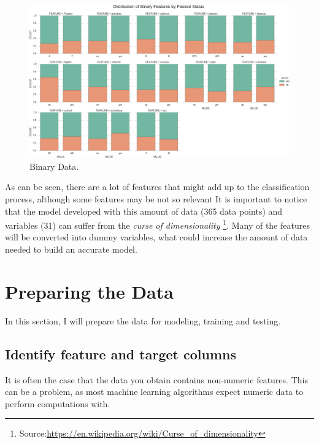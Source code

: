 \documentclass[a4paper]{article}
\begin{document}
\begin{figure}[ht]
\centering
\includegraphics[width=1\textwidth]{figures/binary.png}
\caption{\label{fig:binary}Binary Data.}
\end{figure}

As can be seen, there are a lot of features that might add up to the classification process, although some features may be not so relevant It is important to notice that the model developed with this amount of data (365 data points) and variables (31) can suffer from the  \textit{curse of dimensionality} \footnote{Source:\url{https://en.wikipedia.org/wiki/Curse_of_dimensionality}}. Many of the features will be converted into dummy variables, what could increase the amount of data needed to build an accurate model.


\section{Preparing the Data}
In this section, I will prepare the data for modeling, training and testing.
\subsection{Identify feature and target columns}
It is often the case that the data you obtain contains non-numeric features. This can be a problem, as most machine learning algorithms expect numeric data to perform computations with.
\end{document}
